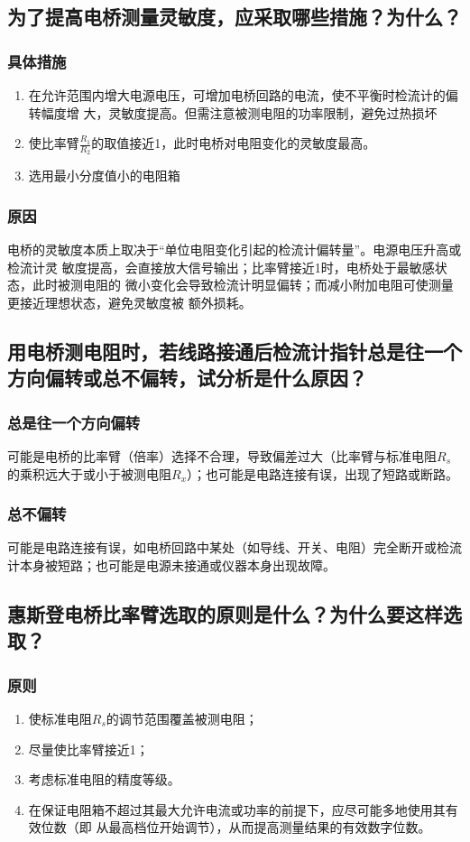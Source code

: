 \documentclass{../../templates/Report}%
\begin{document}
\begin{fullreportonly}
\subsection{为了提高电桥测量灵敏度，应采取哪些措施？为什么？}
\subsubsection{具体措施}
\begin{enumerate}
    \item 在允许范围内增大电源电压，可增加电桥回路的电流，使不平衡时检流计的偏转幅度增
    大，灵敏度提高。但需注意被测电阻的功率限制，避免过热损坏
    \item 使比率臂$\frac{R_1}{R_2}$的取值接近1，此时电桥对电阻变化的灵敏度最高。
    \item 选用最小分度值小的电阻箱
\end{enumerate}
\subsubsection{原因}
电桥的灵敏度本质上取决于“单位电阻变化引起的检流计偏转量”。电源电压升高或检流计灵
敏度提高，会直接放大信号输出；比率臂接近1时，电桥处于最敏感状态，此时被测电阻的
微小变化会导致检流计明显偏转；而减小附加电阻可使测量更接近理想状态，避免灵敏度被
额外损耗。
\subsection{用电桥测电阻时，若线路接通后检流计指针总是往一个方向偏转或总不偏转，试分析是什么原因？}
\subsubsection{总是往一个方向偏转}
可能是电桥的比率臂（倍率）选择不合理，导致偏差过大（比率臂与标准电阻$R_s$的乘积远大于或小于被测电阻$R_x$）；也可能是电路连接有误，出现了短路或断路。
\subsubsection{总不偏转}
可能是电路连接有误，如电桥回路中某处（如导线、开关、电阻）完全断开或检流计本身被短路；也可能是电源未接通或仪器本身出现故障。
\subsection{惠斯登电桥比率臂选取的原则是什么？为什么要这样选取？}
\subsubsection{原则}
\begin{enumerate}
    \item 使标准电阻$R_s$的调节范围覆盖被测电阻；
    \item 尽量使比率臂接近1；
    \item 考虑标准电阻的精度等级。
    \item 在保证电阻箱不超过其最大允许电流或功率的前提下，应尽可能多地使用其有效位数（即
        从最高档位开始调节），从而提高测量结果的有效数字位数。
\end{enumerate}

\end{fullreportonly}
\end{document}
